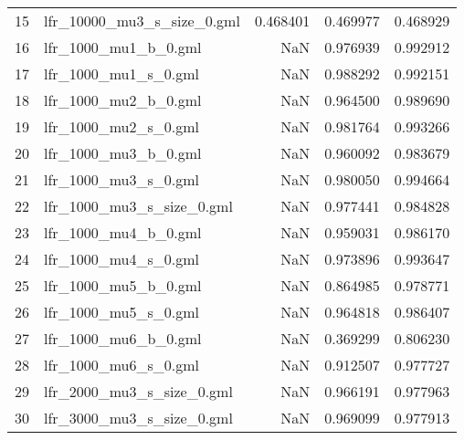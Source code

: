 \begin{tabular}{llrrr}
15 &  lfr\_10000\_mu3\_s\_size\_0.gml &            0.468401 &                      0.469977 &                    0.468929 \\
16 &        lfr\_1000\_mu1\_b\_0.gml &                 NaN &                      0.976939 &                    0.992912 \\
17 &        lfr\_1000\_mu1\_s\_0.gml &                 NaN &                      0.988292 &                    0.992151 \\
18 &        lfr\_1000\_mu2\_b\_0.gml &                 NaN &                      0.964500 &                    0.989690 \\
19 &        lfr\_1000\_mu2\_s\_0.gml &                 NaN &                      0.981764 &                    0.993266 \\
20 &        lfr\_1000\_mu3\_b\_0.gml &                 NaN &                      0.960092 &                    0.983679 \\
21 &        lfr\_1000\_mu3\_s\_0.gml &                 NaN &                      0.980050 &                    0.994664 \\
22 &   lfr\_1000\_mu3\_s\_size\_0.gml &                 NaN &                      0.977441 &                    0.984828 \\
23 &        lfr\_1000\_mu4\_b\_0.gml &                 NaN &                      0.959031 &                    0.986170 \\
24 &        lfr\_1000\_mu4\_s\_0.gml &                 NaN &                      0.973896 &                    0.993647 \\
25 &        lfr\_1000\_mu5\_b\_0.gml &                 NaN &                      0.864985 &                    0.978771 \\
26 &        lfr\_1000\_mu5\_s\_0.gml &                 NaN &                      0.964818 &                    0.986407 \\
27 &        lfr\_1000\_mu6\_b\_0.gml &                 NaN &                      0.369299 &                    0.806230 \\
28 &        lfr\_1000\_mu6\_s\_0.gml &                 NaN &                      0.912507 &                    0.977727 \\
29 &   lfr\_2000\_mu3\_s\_size\_0.gml &                 NaN &                      0.966191 &                    0.977963 \\
30 &   lfr\_3000\_mu3\_s\_size\_0.gml &                 NaN &                      0.969099 &                    0.977913 \\

\end{tabular}
